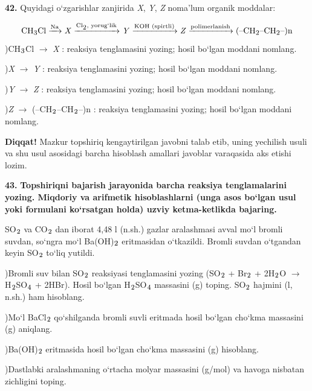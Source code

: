 \documentclass[11pt,a4paper]{article}
\renewcommand{\textsubscript}[1]{\ensuremath{_{\text{\fontsize{8}{8}\selectfont #1}}}}
\newcommand{\diqqat}[1]{\par\smallskip\noindent\textbf{Diqqat!} #1\par\medskip}
\begin{document}
\noindent\textbf{42.} Quyidagi o`zgarishlar zanjirida \textit{X}, \textit{Y}, \textit{Z} noma'lum organik moddalar:\par
\[\setlength{\fboxsep}{0pt}\text{CH\textsubscript{3}Cl}\xrightarrow{\text{Na}}\text{\textit{X}}\xrightarrow{\text{Cl\textsubscript{2}, yorug`lik}}\text{\textit{Y}}\xrightarrow{\text{KOH (spirtli)}}\text{\textit{Z}}\xrightarrow{\text{polimerlanish}}\text{(--CH\textsubscript{2}--CH\textsubscript{2}--)n}\]
)CH\textsubscript{3}Cl $\to$ \textit{X} : reaksiya tenglamasini yozing; hosil bo`lgan moddani nomlang.\par
{})\textit{X} $\to$ \textit{Y} : reaksiya tenglamasini yozing; hosil bo`lgan moddani nomlang.\par
{})\textit{Y} $\to$ \textit{Z} : reaksiya tenglamasini yozing; hosil bo`lgan moddani nomlang.\par
{})\textit{Z} $\to$ (--CH\textsubscript{2}--CH\textsubscript{2}--)n : reaksiya tenglamasini yozing; hosil bo`lgan moddani nomlang.\par
\diqqat{Mazkur topshiriq kengaytirilgan javobni talab etib, uning yechilish usuli va shu usul asosidagi barcha hisoblash amallari javoblar varaqasida aks etishi lozim.}
\noindent\textbf{43.} \textbf{Topshiriqni bajarish jarayonida barcha reaksiya tenglamalarini yozing. Miqdoriy va arifmetik hisoblashlarni (unga asos bo`lgan usul yoki formulani ko`rsatgan holda) uzviy ketma-ketlikda bajaring.}\par\smallskip
SO\textsubscript{2} va CO\textsubscript{2} dan iborat 4,48 l (n.sh.) gazlar aralashmasi avval mo`l bromli suvdan, so`ngra mo`l Ba(OH)\textsubscript{2} eritmasidan o`tkazildi. Bromli suvdan o`tgandan keyin SO\textsubscript{2} to`liq yutildi.\par
{})Bromli suv bilan SO\textsubscript{2} reaksiyasi tenglamasini yozing (SO\textsubscript{2} + Br\textsubscript{2} + 2H\textsubscript{2}O $\to$ H\textsubscript{2}SO\textsubscript{4} + 2HBr). Hosil bo`lgan H\textsubscript{2}SO\textsubscript{4} massasini (g) toping. SO\textsubscript{2} hajmini (l, n.sh.) ham hisoblang.\par
{})Mo`l BaCl\textsubscript{2} qo`shilganda bromli suvli eritmada hosil bo`lgan cho`kma massasini (g) aniqlang.\par
{})Ba(OH)\textsubscript{2} eritmasida hosil bo`lgan cho`kma massasini (g) hisoblang.\par
{})Dastlabki aralashmaning o`rtacha molyar massasini (g/mol) va havoga nisbatan zichligini toping.\par
\end{document}
